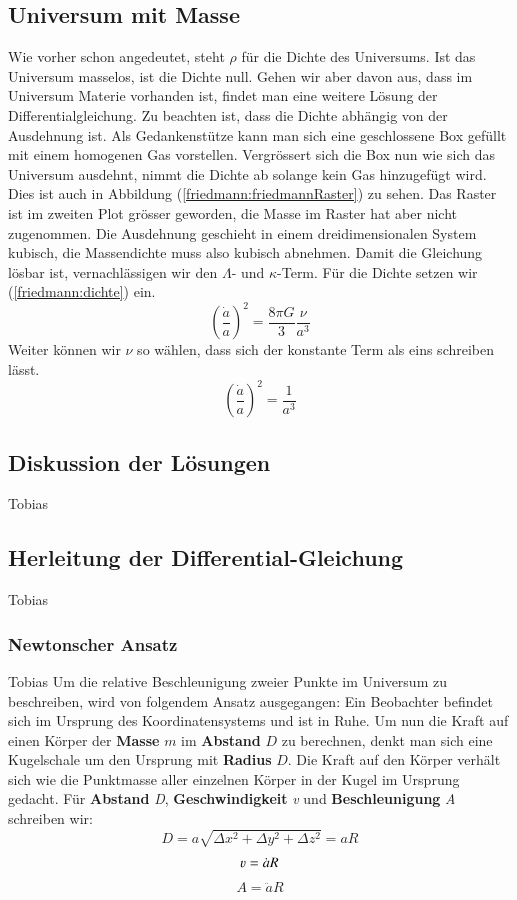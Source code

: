 \begin{refsection}
\subsection{Universum mit Masse}
Wie vorher schon angedeutet, steht $\rho$ für die Dichte des Universums. Ist das Universum masselos, ist die Dichte null. Gehen wir aber davon aus, dass im Universum Materie vorhanden ist, findet man eine weitere Lösung der Differentialgleichung. Zu beachten ist, dass die Dichte abhängig von der Ausdehnung ist. Als Gedankenstütze kann man sich eine geschlossene Box gefüllt mit einem homogenen Gas vorstellen. Vergrössert sich die Box nun wie sich das Universum ausdehnt, nimmt die Dichte ab solange kein Gas hinzugefügt wird. Dies ist auch in Abbildung (\ref{friedmann:friedmannRaster}) zu sehen. Das Raster ist im zweiten Plot grösser geworden, die Masse im Raster hat aber nicht zugenommen. Die Ausdehnung geschieht in einem dreidimensionalen System kubisch, die Massendichte muss also kubisch abnehmen. Damit die Gleichung lösbar ist, vernachlässigen wir den $\Lambda$- und $\kappa$-Term. Für die Dichte setzen wir (\ref{friedmann:dichte}) ein. 
\[\left(\frac{\dot{a}}{a}\right) ^2 = \frac{8 \pi G}{3} \frac{\nu}{a^3}\]
Weiter können wir $\nu$ so wählen, dass sich der konstante Term als eins schreiben lässt.
\[\left(\frac{\dot{a}}{a}\right) ^2 = \frac{1}{a^3}\]

\subsection*{Diskussion der Lösungen}
Tobias
\subsection{Herleitung der Differential-Gleichung}
Tobias
\subsubsection{Newtonscher Ansatz}
Tobias
Um die relative Beschleunigung zweier Punkte im Universum zu beschreiben, wird von folgendem Ansatz ausgegangen: Ein Beobachter befindet sich im Ursprung des Koordinatensystems und ist in Ruhe. Um nun die Kraft auf einen Körper der \textbf{Masse} $m$ im \textbf{Abstand} $D$ zu berechnen, denkt man sich eine Kugelschale um den Ursprung mit \textbf{Radius} $D$. Die Kraft auf den Körper verhält sich wie die Punktmasse aller  einzelnen Körper in der Kugel im Ursprung gedacht.
Für \textbf{Abstand} \textit{D}, \textbf{Geschwindigkeit} \textit{v} und \textbf{Beschleunigung} \textit{A} schreiben wir:
\[D =  a \sqrt{\Delta x^2 + \Delta y^2 + \Delta z^2}  = a R\]
\[\varv = \dot{a} R\]
\[A = \ddot{a} R\]


\end{refsection}
